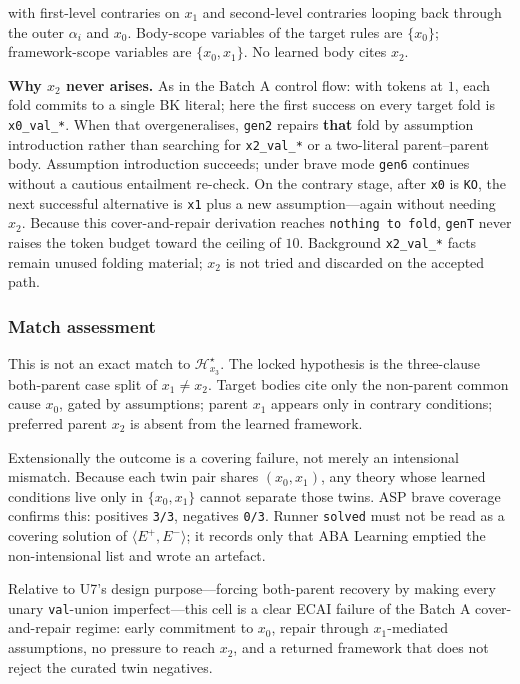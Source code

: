 \documentclass[11pt]{article}
\begin{document}
with first-level contraries on \(x_1\) and second-level contraries looping back through the outer \(\alpha_i\) and \(x_0\). Body-scope variables of the target rules are \(\{x_0\}\); framework-scope variables are \(\{x_0,x_1\}\). No learned body cites \(x_2\).

\textbf{Why \(x_2\) never arises.} As in the Batch A control flow: with tokens at \(1\), each fold commits to a single BK literal; here the first success on every target fold is \texttt{x0\_val\_*}. When that overgeneralises, \texttt{gen2} repairs \textbf{that} fold by assumption introduction rather than searching for \texttt{x2\_val\_*} or a two-literal parent--parent body. Assumption introduction succeeds; under brave mode \texttt{gen6} continues without a cautious entailment re-check. On the contrary stage, after \texttt{x0} is \texttt{KO}, the next successful alternative is \texttt{x1} plus a new assumption---again without needing \(x_2\). Because this cover-and-repair derivation reaches \texttt{nothing to fold}, \texttt{genT} never raises the token budget toward the ceiling of \(10\). Background \texttt{x2\_val\_*} facts remain unused folding material; \(x_2\) is not tried and discarded on the accepted path.

\subsubsection{Match assessment}

This is not an exact match to \(\mathcal{H}_{x_3}^\star\). The locked hypothesis is the three-clause both-parent case split of \(x_1\neq x_2\). Target bodies cite only the non-parent common cause \(x_0\), gated by assumptions; parent \(x_1\) appears only in contrary conditions; preferred parent \(x_2\) is absent from the learned framework.

Extensionally the outcome is a covering failure, not merely an intensional mismatch. Because each twin pair shares \((x_0,x_1)\), any theory whose learned conditions live only in \(\{x_0,x_1\}\) cannot separate those twins. ASP brave coverage confirms this: positives \texttt{3/3}, negatives \texttt{0/3}. Runner \texttt{solved} must not be read as a covering solution of \(\langle E^+,E^-\rangle\); it records only that ABA Learning emptied the non-intensional list and wrote an artefact.

Relative to U7's design purpose---forcing both-parent recovery by making every unary \texttt{val}-union imperfect---this cell is a clear ECAI failure of the Batch A cover-and-repair regime: early commitment to \(x_0\), repair through \(x_1\)-mediated assumptions, no pressure to reach \(x_2\), and a returned framework that does not reject the curated twin negatives.
\end{document}
